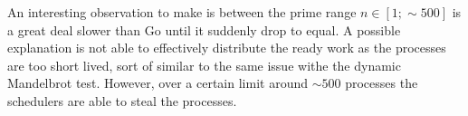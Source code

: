 An interesting observation to make is between the prime range $n\in[1;\sim{}500]$ \Proxc{} is a great deal slower than Go until it suddenly drop to equal. A possible explanation is not able to effectively distribute the ready work as the processes are too short lived, sort of similar to the same issue withe the dynamic Mandelbrot test. However, over a certain limit around $\sim{}500$ processes the schedulers are able to steal the processes.

